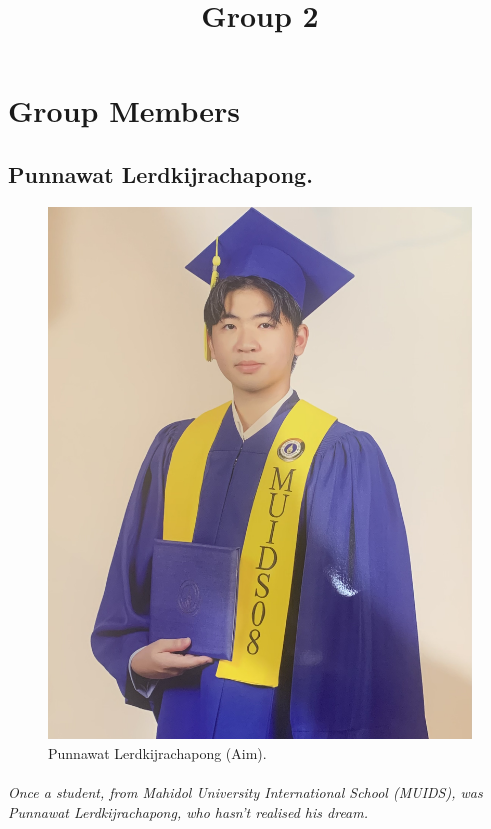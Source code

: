 \documentclass[11pt]{book}
\title{Group 2}
\begin{document}
\maketitle
\tableofcontents
	\part{Group Members}
		\chapter{Punnawat Lerdkijrachapong.}
						\begin{figure}[H]
							\begin{center}
  							\includegraphics[scale=0.06]{Photos/Punnawat_Lerdkijrachapong.jpeg}
  							\end{center}
 							\caption{Punnawat Lerdkijrachapong (Aim).}
			\end{figure}
						
\paragraph{Once a student, from \textit{Mahidol University International School (MUIDS)}, was \textit{Punnawat Lerdkijrachapong}, who hasn't realised his dream.}
\end{document}
